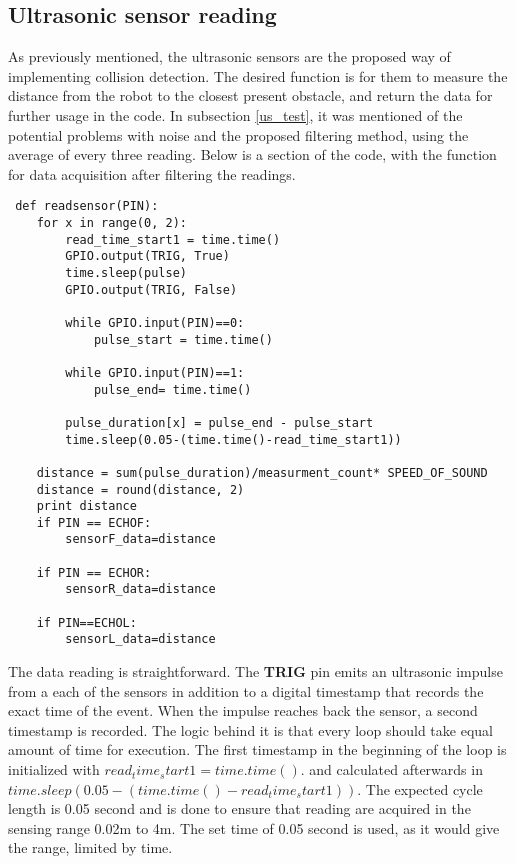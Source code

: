 \subsection{Ultrasonic sensor reading}


As previously mentioned, the ultrasonic sensors are the proposed way of implementing collision detection. The desired function is for them to measure the distance from the robot to the closest present obstacle, and return the data for further usage in the code.
In subsection \ref{us_test}, it was mentioned of the potential problems with noise and the proposed filtering method, using the average of every three reading. 
Below is a section of the code, with the function for data acquisition after filtering the readings.

\begin{lstlisting}
 def readsensor(PIN):
	for x in range(0, 2):
		read_time_start1 = time.time()
		GPIO.output(TRIG, True)
		time.sleep(pulse)
		GPIO.output(TRIG, False)

		while GPIO.input(PIN)==0:
			pulse_start = time.time()

		while GPIO.input(PIN)==1:
			pulse_end= time.time()

		pulse_duration[x] = pulse_end - pulse_start
		time.sleep(0.05-(time.time()-read_time_start1))

	distance = sum(pulse_duration)/measurment_count* SPEED_OF_SOUND
	distance = round(distance, 2)
	print distance
	if PIN == ECHOF:
		sensorF_data=distance

	if PIN == ECHOR:
		sensorR_data=distance

	if PIN==ECHOL:
		sensorL_data=distance
\end{lstlisting}

The data reading is straightforward. The \textbf{TRIG} pin emits an ultrasonic impulse from a each of the sensors in addition to a digital timestamp that records the exact time of the event. When the impulse reaches back the sensor, a second timestamp is recorded. The logic behind it is that every loop should take equal amount of time for execution. 
The first timestamp in the beginning of the loop is initialized with \textbf{$read_time_start1 = time.time().$} and calculated afterwards in \textbf{$time.sleep(0.05-(time.time()-read_time_start1))$}. The expected cycle length is 0.05 second and is done to ensure that reading are acquired in the sensing range 0.02m to 4m.
The set time of 0.05 second is used, as it would give the range, limited by time.

